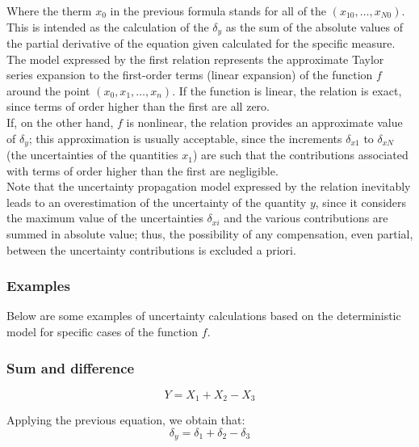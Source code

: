 \documentclass[../main.tex]{subfiles}
\begin{document}
Where the therm $x_0$ in the previous formula stands for all of the $(x_{10},\dots,x_{N0})$. This is intended as the calculation of the $\delta_y$ as the sum of the absolute values of the partial derivative of the equation given calculated for the specific measure.\\

The model expressed by the first relation represents the approximate Taylor series expansion to the first-order terms (linear expansion) of the function $f$ around the point $(x_0, x_1, \dots, x_n)$. If the function is linear, the relation is exact, since terms of order higher than the first are all zero. \\

If, on the other hand, $f$ is nonlinear, the relation provides an approximate value of $\delta_y$; this approximation is usually acceptable, since the increments $\delta_{x1}$ to $\delta_{xN}$ (the uncertainties of the quantities $x_1$) are such that the contributions associated with terms of order higher than the first are negligible.\\

Note that the uncertainty propagation model expressed by the relation inevitably leads to an overestimation of the uncertainty of the quantity $y$, since it considers the maximum value of the uncertainties $\delta_{xi}$ and the various contributions are summed in absolute value; thus, the possibility of any compensation, even partial, between the uncertainty contributions is excluded a priori.

\subsubsection{Examples}

Below are some examples of uncertainty calculations based on the deterministic model for specific cases of the function $f$.

\subsubsection*{Sum and difference}

\begin{equation}
	Y = X_1 + X_2 - X_3
\end{equation}

Applying the previous equation, we obtain that:\\

\begin{equation}
	\delta_y = \delta_1 + \delta_2 - \delta_3
\end{equation}
\end{document}
